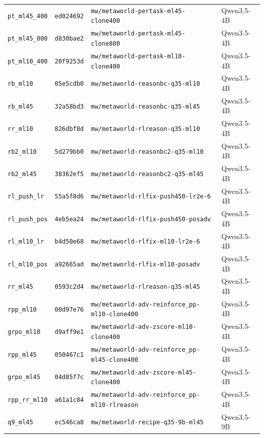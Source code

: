 \begin{longtable}{@{}llll@{}}
\texttt{pt\_ml45\_400} & \texttt{ed024692} & \texttt{mw/metaworld-pertask-ml45-clone400} & Qwen3.5-4B \\
\texttt{pt\_ml45\_800} & \texttt{d830bae2} & \texttt{mw/metaworld-pertask-ml45-clone800} & Qwen3.5-4B \\
\texttt{pt\_ml10\_400} & \texttt{20f9253d} & \texttt{mw/metaworld-pertask-ml10-clone400} & Qwen3.5-4B \\
\texttt{rb\_ml10} & \texttt{05e5cdb0} & \texttt{mw/metaworld-reasonbc-q35-ml10} & Qwen3.5-4B \\
\texttt{rb\_ml45} & \texttt{32a58bd3} & \texttt{mw/metaworld-reasonbc-q35-ml45} & Qwen3.5-4B \\
\texttt{rr\_ml10} & \texttt{826dbf8d} & \texttt{mw/metaworld-rlreason-q35-ml10} & Qwen3.5-4B \\
\texttt{rb2\_ml10} & \texttt{5d279bb0} & \texttt{mw/metaworld-reasonbc2-q35-ml10} & Qwen3.5-4B \\
\texttt{rb2\_ml45} & \texttt{38362ef5} & \texttt{mw/metaworld-reasonbc2-q35-ml45} & Qwen3.5-4B \\
\texttt{rl\_push\_lr} & \texttt{55a5f8d6} & \texttt{mw/metaworld-rlfix-push450-lr2e-6} & Qwen3.5-4B \\
\texttt{rl\_push\_pos} & \texttt{4eb5ea24} & \texttt{mw/metaworld-rlfix-push450-posadv} & Qwen3.5-4B \\
\texttt{rl\_ml10\_lr} & \texttt{b4d50e68} & \texttt{mw/metaworld-rlfix-ml10-lr2e-6} & Qwen3.5-4B \\
\texttt{rl\_ml10\_pos} & \texttt{a92665ad} & \texttt{mw/metaworld-rlfix-ml10-posadv} & Qwen3.5-4B \\
\texttt{rr\_ml45} & \texttt{0593c2d4} & \texttt{mw/metaworld-rlreason-q35-ml45} & Qwen3.5-4B \\
\texttt{rpp\_ml10} & \texttt{00d97e76} & \texttt{mw/metaworld-adv-reinforce\_pp-ml10-clone400} & Qwen3.5-4B \\
\texttt{grpo\_ml10} & \texttt{d9aff9e1} & \texttt{mw/metaworld-adv-zscore-ml10-clone400} & Qwen3.5-4B \\
\texttt{rpp\_ml45} & \texttt{050467c1} & \texttt{mw/metaworld-adv-reinforce\_pp-ml45-clone400} & Qwen3.5-4B \\
\texttt{grpo\_ml45} & \texttt{04d85f7c} & \texttt{mw/metaworld-adv-zscore-ml45-clone400} & Qwen3.5-4B \\
\texttt{rpp\_rr\_ml10} & \texttt{a61a1c84} & \texttt{mw/metaworld-adv-reinforce\_pp-ml10-rlreason} & Qwen3.5-4B \\
\texttt{q9\_ml45} & \texttt{ec546ca8} & \texttt{mw/metaworld-recipe-q35-9b-ml45} & Qwen3.5-9B \\

\end{longtable}
